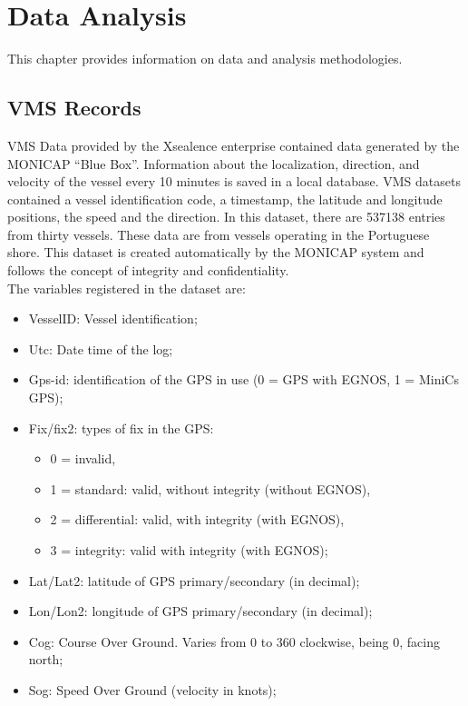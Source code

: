 % 
%  
%
\chapter{Data Analysis}
\label{cha:data}
This chapter provides information on data and analysis methodologies.



\section{VMS Records} %
\label{sec:vms_records}

VMS Data provided by the Xsealence \cite{WEBSITE:Xsealence} enterprise contained data generated by the MONICAP \cite{WEBSITE:MonicapXsealence} “Blue Box”. Information about the localization, direction, and velocity of the vessel every 10 minutes is saved in a local database. VMS datasets contained a vessel identification code, a timestamp, the latitude and longitude positions, the speed and the direction. In this dataset, there are 537138 entries from thirty vessels. These data are from vessels operating in the Portuguese shore.  
This dataset is created automatically by the MONICAP system and follows the concept of integrity and confidentiality.\\
The variables registered in the dataset are:
\begin{itemize}
\item VesselID: Vessel identification;
\item    Utc: Date time of the log;
\item    Gps-id: identification of the GPS in use (0 = GPS with EGNOS, 1 = MiniCs GPS);
\item    Fix/fix2: types of fix in the GPS:
\begin{itemize}
\item    0 = invalid, 
\item    1 = standard: valid, without integrity (without EGNOS), 
\item    2 = differential: valid, with integrity (with EGNOS), 
\item    3 = integrity: valid with integrity (with EGNOS);
\end{itemize}
\item    Lat/Lat2: latitude of GPS primary/secondary (in decimal);
\item    Lon/Lon2: longitude of GPS primary/secondary (in decimal);
\item    Cog: Course Over Ground. Varies from 0 to 360 clockwise, being 0, facing north;
\item    Sog: Speed Over Ground (velocity in knots);


\end{itemize}



